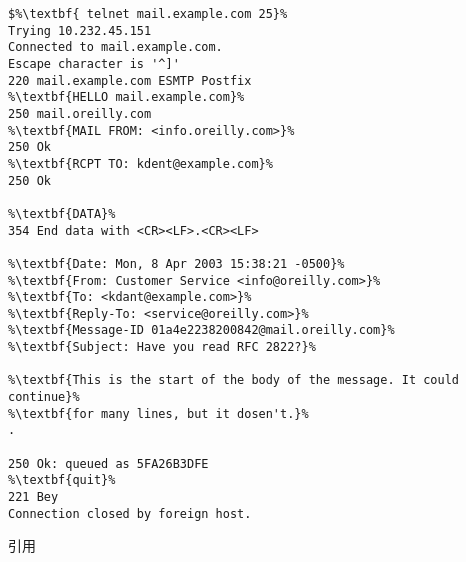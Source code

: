\begin{lstlisting}[escapechar=\%,frame={single},caption={\smtp コマンド入力},label={src:smtpコマンド入力}]
$%\textbf{ telnet mail.example.com 25}%
Trying 10.232.45.151
Connected to mail.example.com.
Escape character is '^]'
220 mail.example.com ESMTP Postfix
%\textbf{HELLO mail.example.com}%
250 mail.oreilly.com
%\textbf{MAIL FROM: <info.oreilly.com>}%
250 Ok
%\textbf{RCPT TO: kdent@example.com}%
250 Ok

%\textbf{DATA}%
354 End data with <CR><LF>.<CR><LF>

%\textbf{Date: Mon, 8 Apr 2003 15:38:21 -0500}%
%\textbf{From: Customer Service <info@oreilly.com>}%
%\textbf{To: <kdant@example.com>}%
%\textbf{Reply-To: <service@oreilly.com>}%
%\textbf{Message-ID 01a4e2238200842@mail.oreilly.com}%
%\textbf{Subject: Have you read RFC 2822?}%

%\textbf{This is the start of the body of the message. It could continue}%
%\textbf{for many lines, but it dosen't.}%
.

250 Ok: queued as 5FA26B3DFE
%\textbf{quit}%
221 Bey
Connection closed by foreign host.
    \end{lstlisting}
\hfill 引用\cite[p.18]{Postfix実用ガイド}\par